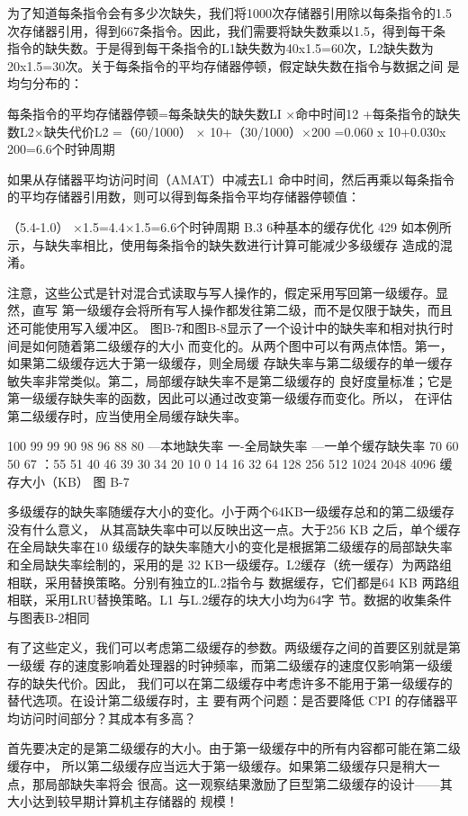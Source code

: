 为了知道每条指令会有多少次缺失，我们将1000次存储器引用除以每条指令的1.5
次存储器引用，得到667条指令。因此，我们需要将缺失数乘以1.5，得到每干条
指令的缺失数。于是得到每干条指令的L1缺失数为40x1.5=60次，L2缺失数为
20x1.5=30次。关于每条指令的平均存储器停顿，假定缺失数在指令与数据之间
是均匀分布的：

每条指令的平均存储器停顿=每条缺失的缺失数LI ×命中时间12
+每条指令的缺失数L2×缺失代价L2
=（60/1000） × 10+（30/1000）×200
=0.060 x 10+0.030x 200=6.6个时钟周期

如果从存储器平均访问时间（AMAT）中减去L1 命中时间，然后再乘以每条指令
的平均存储器引用数，则可以得到每条指令平均存储器停顿值：

（5.4-1.0） ×1.5=4.4×1.5=6.6个时钟周期
B.3 6种基本的缓存优化
429
如本例所示，与缺失率相比，使用每条指令的缺失数进行计算可能减少多级缓存
造成的混淆。

注意，这些公式是针对混合式读取与写人操作的，假定采用写回第一级缓存。显然，直写
第一级缓存会将所有写人操作都发往第二级，而不是仅限于缺失，而且还可能使用写入缓冲区。
图B-7和图B-8显示了一个设计中的缺失率和相对执行时间是如何随着第二级缓存的大小
而变化的。从两个图中可以有两点体悟。第一，如果第二级缓存远大于第一级缓存，则全局缓
存缺失率与第二级缓存的单一缓存敏失率非常类似。第二，局部缓存缺失率不是第二级缓存的
良好度量标准；它是第一级缓存缺失率的函数，因此可以通过改变第一级缓存而变化。所以，
在评估第二级缓存时，应当使用全局缓存缺失率。

100%
99%
99%
90%
98%
96%
88%
80%
—本地缺失率
一-全局缺失率
—一单个缓存缺失率
70%
60%
50%
67%
：55%
51%
40%
46%
39%
30%
34%
20%
10%
0%
14%
16
32
64
128
256
512
1024 2048
4096
缓存大小（KB）
图 B-7

多级缓存的缺失率随缓存大小的变化。小于两个64KB一级缓存总和的第二级缓存没有什么意义，
从其高缺失率中可以反映出这一点。大于256 KB 之后，单个缓存在全局缺失率在10%
级缓存的缺失率随大小的变化是根据第二级缓存的局部缺失率和全局缺失率绘制的，采用的是
32 KB一级缓存。L2缓存（统一缓存）为两路组相联，采用替换策略。分别有独立的L.2指令与
数据缓存，它们都是64 KB 两路组相联，采用LRU替换策略。L1 与L.2缓存的块大小均为64字
节。数据的收集条件与图表B-2相同

有了这些定义，我们可以考虑第二级缓存的参数。两级缓存之间的首要区别就是第一级缓
存的速度影响着处理器的时钟频率，而第二级缓存的速度仅影响第一级缓存的缺失代价。因此，
我们可以在第二级缓存中考虑许多不能用于第一级缓存的替代选项。在设计第二级缓存时，主
要有两个问题：是否要降低 CPI 的存储器平均访问时间部分？其成本有多高？

首先要决定的是第二级缓存的大小。由于第一级缓存中的所有内容都可能在第二级缓存中，
所以第二级缓存应当远大于第一级缓存。如果第二级缓存只是稍大一点，那局部缺失率将会
很高。这一观察结果激励了巨型第二级缓存的设计——其大小达到较早期计算机主存储器的
规模！

